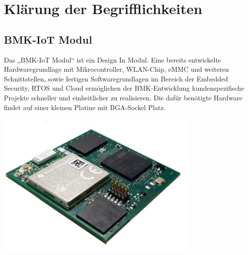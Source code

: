 \documentclass[a4paper,11pt]{scrartcl}
\begin{document}
\section{Klärung der Begrifflichkeiten}


\subsection{BMK-IoT Modul}
Das „BMK-IoT Modul“ ist ein Design In Modul. Eine bereits entwickelte Hardwaregrundlage mit Mikrocontroller, WLAN-Chip, eMMC und weiteren Schnittstellen, sowie fertigen Softwaregrundlagen im Bereich der Embedded Security, RTOS und Cloud ermöglichen der BMK-Entwicklung kundenspezifische Projekte schneller und einheitlicher zu realisieren.
Die dafür benötigte Hardware findet auf einer kleinen Platine mit BGA-Sockel Platz. 

\begin{center}
\includegraphics[width=10cm]{Bilder/BMK-IOT-MODUL.png}
\end{center}


\end{document}
